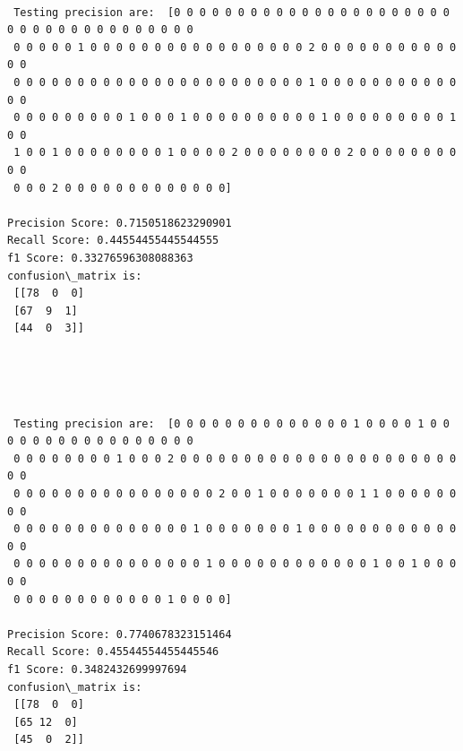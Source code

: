 \documentclass[11pt]{article}
\begin{document}
    \begin{Verbatim}[commandchars=\\\{\}]

 Testing precision are:  [0 0 0 0 0 0 0 0 0 0 0 0 0 0 0 0 0 0 0 0 0 0 0 0 0 0 0 0 0 0 0 0 0 0 0 0 0
 0 0 0 0 0 1 0 0 0 0 0 0 0 0 0 0 0 0 0 0 0 0 0 2 0 0 0 0 0 0 0 0 0 0 0 0 0
 0 0 0 0 0 0 0 0 0 0 0 0 0 0 0 0 0 0 0 0 0 0 0 1 0 0 0 0 0 0 0 0 0 0 0 0 0
 0 0 0 0 0 0 0 0 0 1 0 0 0 1 0 0 0 0 0 0 0 0 0 0 1 0 0 0 0 0 0 0 0 0 1 0 0
 1 0 0 1 0 0 0 0 0 0 0 0 1 0 0 0 0 2 0 0 0 0 0 0 0 0 2 0 0 0 0 0 0 0 0 0 0
 0 0 0 2 0 0 0 0 0 0 0 0 0 0 0 0 0] 

Precision Score: 0.7150518623290901
Recall Score: 0.44554455445544555
f1 Score: 0.33276596308088363
confusion\_matrix is: 
 [[78  0  0]
 [67  9  1]
 [44  0  3]] 


    \end{Verbatim}

    \begin{center}
    \end{center}
    { \hspace*{\fill} \\}
    
    \begin{Verbatim}[commandchars=\\\{\}]

 Testing precision are:  [0 0 0 0 0 0 0 0 0 0 0 0 0 0 1 0 0 0 0 1 0 0 0 0 0 0 0 0 0 0 0 0 0 0 0 0 0
 0 0 0 0 0 0 0 0 1 0 0 0 2 0 0 0 0 0 0 0 0 0 0 0 0 0 0 0 0 0 0 0 0 0 0 0 0
 0 0 0 0 0 0 0 0 0 0 0 0 0 0 0 0 2 0 0 1 0 0 0 0 0 0 0 1 1 0 0 0 0 0 0 0 0
 0 0 0 0 0 0 0 0 0 0 0 0 0 0 1 0 0 0 0 0 0 0 1 0 0 0 0 0 0 0 0 0 0 0 0 0 0
 0 0 0 0 0 0 0 0 0 0 0 0 0 0 0 1 0 0 0 0 0 0 0 0 0 0 0 0 1 0 0 1 0 0 0 0 0
 0 0 0 0 0 0 0 0 0 0 0 0 1 0 0 0 0] 

Precision Score: 0.7740678323151464
Recall Score: 0.45544554455445546
f1 Score: 0.3482432699997694
confusion\_matrix is: 
 [[78  0  0]
 [65 12  0]
 [45  0  2]] 


    \end{Verbatim}

    \begin{center}
    \end{center}
    { \hspace*{\fill} \\}
    
\end{document}

